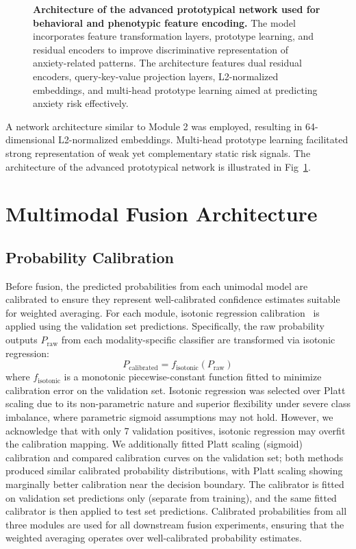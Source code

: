 \documentclass[10pt,letterpaper]{article}
\begin{document}
\begin{figure}[!h]
\caption{\textbf{Architecture of the advanced prototypical network used for behavioral and phenotypic feature encoding.}
The model incorporates feature transformation layers, prototype learning, and residual encoders to improve discriminative representation of anxiety-related patterns. The architecture features dual residual encoders, query-key-value projection layers, L2-normalized embeddings, and multi-head prototype learning aimed at predicting anxiety risk effectively.}
\label{fig:proto_architecture}
\end{figure}

A network architecture similar to Module 2 was employed, resulting in 64-dimensional L2-normalized embeddings. Multi-head prototype learning facilitated strong representation of weak yet complementary static risk signals. The architecture of the advanced prototypical network is illustrated in Fig~\ref{fig:proto_architecture}.


\section*{Multimodal Fusion Architecture}
\subsection*{Probability Calibration}

Before fusion, the predicted probabilities from each unimodal model are calibrated to ensure they represent well-calibrated confidence estimates suitable for weighted averaging. For each module, isotonic regression calibration~\cite{ref48} is applied using the validation set predictions. Specifically, the raw probability outputs $P_{\text{raw}}$ from each modality-specific classifier are transformed via isotonic regression:
\begin{equation}
P_{\text{calibrated}} = f_{\text{isotonic}}(P_{\text{raw}})
\end{equation}
where $f_{\text{isotonic}}$ is a monotonic piecewise-constant function fitted to minimize calibration error on the validation set. Isotonic regression was selected over Platt scaling due to its non-parametric nature and superior flexibility under severe class imbalance, where parametric sigmoid assumptions may not hold. However, we acknowledge that with only 7 validation positives, isotonic regression may overfit the calibration mapping. We additionally fitted Platt scaling (sigmoid) calibration and compared calibration curves on the validation set; both methods produced similar calibrated probability distributions, with Platt scaling showing marginally better calibration near the decision boundary. The calibrator is fitted on validation set predictions only (separate from training), and the same fitted calibrator is then applied to test set predictions. Calibrated probabilities from all three modules are used for all downstream fusion experiments, ensuring that the weighted averaging operates over well-calibrated probability estimates.
\end{document}
